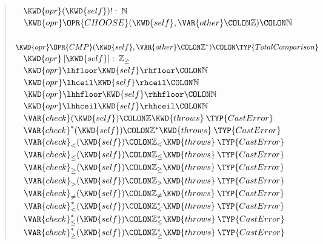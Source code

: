 \begin{description}
\begin{quote}
\begin{Fortress}
{\tt~~}\(  \KWD{opr} (\KWD{self})! \mathrel{\mathtt{:}}\mskip 4mu plus 4mu\mathbb{N}\)\\
{\tt~~}\(  \KWD{opr} \mathord{\OPR{CHOOSE}}(\KWD{self}, \VAR{other}\COLON \mathbb{Z})\COLON \mathbb{N}\)\\
{\tt~~}\(  \KWD{opr} \mathord{\OPR{CMP}}(\KWD{self}, \VAR{other}\COLON \mathbb{Z}^*)\COLON \TYP{TotalComparison}\)\\
{\tt~~}\(  \KWD{opr} \left|\mathord{\KWD{self}}\right| \mathrel{\mathtt{:}}\mskip 4mu plus 4mu\mathbb{Z}_{\geq}\)\\
{\tt~~}\(  \KWD{opr} \lhfloor \mathord{\KWD{self}} \rhfloor\COLON \mathbb{N}\)\\
{\tt~~}\(  \KWD{opr} \lhceil \mathord{\KWD{self}} \rhceil\COLON \mathbb{N}\)\\
{\tt~~}\(  \KWD{opr} \lhhfloor \mathord{\KWD{self}} \rhhfloor\COLON \mathbb{N}\)\\
{\tt~~}\(  \KWD{opr} \lhhceil \mathord{\KWD{self}} \rhhceil\COLON \mathbb{N}\)\\
{\tt~~}\(  \VAR{check}(\KWD{self})\COLON \mathbb{Z} \KWD{throws}\mskip 4mu plus 4mu\TYP{CastError}\)\\
{\tt~~}\(  \VAR{check}^*(\KWD{self})\COLON \mathbb{Z}^* \KWD{throws}\mskip 4mu plus 4mu\TYP{CastError}\)\\
{\tt~~}\(  \VAR{check}_{<}(\KWD{self})\COLON \mathbb{Z}_{<} \KWD{throws}\mskip 4mu plus 4mu\TYP{CastError}\)\\
{\tt~~}\(  \VAR{check}_{\leq}(\KWD{self})\COLON \mathbb{Z}_{\leq} \KWD{throws}\mskip 4mu plus 4mu\TYP{CastError}\)\\
{\tt~~}\(  \VAR{check}_{\geq}(\KWD{self})\COLON \mathbb{Z}_{\geq} \KWD{throws}\mskip 4mu plus 4mu\TYP{CastError}\)\\
{\tt~~}\(  \VAR{check}_{>}(\KWD{self})\COLON \mathbb{Z}_{>} \KWD{throws}\mskip 4mu plus 4mu\TYP{CastError}\)\\
{\tt~~}\(  \VAR{check}_{\neq}(\KWD{self})\COLON \mathbb{Z}_{\neq} \KWD{throws}\mskip 4mu plus 4mu\TYP{CastError}\)\\
{\tt~~}\(  \VAR{check}^*_{<}(\KWD{self})\COLON \mathbb{Z}^*_{<} \KWD{throws}\mskip 4mu plus 4mu\TYP{CastError}\)\\
{\tt~~}\(  \VAR{check}^*_{\leq}(\KWD{self})\COLON \mathbb{Z}^*_{\leq} \KWD{throws}\mskip 4mu plus 4mu\TYP{CastError}\)\\
{\tt~~}\(  \VAR{check}^*_{\geq}(\KWD{self})\COLON \mathbb{Z}^*_{\geq} \KWD{throws}\mskip 4mu plus 4mu\TYP{CastError}\)\\

\end{Fortress}
\end{quote}
\end{description}
